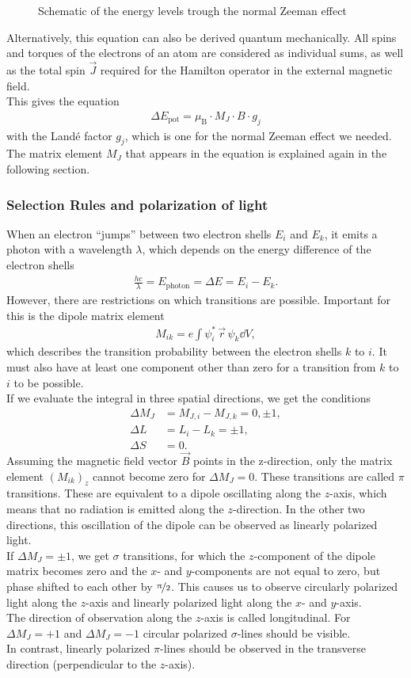\begin{figure}[ht]
\centering

\caption{Schematic of the energy levels trough the normal Zeeman effect}
\label{fig:splitting}
\end{figure}

Alternatively, this equation can also be derived quantum mechanically.
All spins and torques of the electrons of an atom are considered as individual sums, as well as the total spin $\vec{J}$ required for the Hamilton operator in the external magnetic field.\\
This gives the equation
\begin{align}
\Delta E_\text{pot} = \mu_\text{B} \cdot M_J \cdot B \cdot g_j
\end{align}
with the Landé factor $g_j$, which is one for the normal Zeeman effect we needed.
The matrix element $M_J$ that appears in the equation is explained again in the following section.

\subsubsection{Selection Rules and polarization of light}
When an electron \enquote{jumps} between two electron shells $E_i$ and $E_k$, it emits a photon with a wavelength $\lambda$, which depends on the energy difference of the electron shells
\begin{align}
\frac{hc}{\lambda} = E_\text{photon} = \Delta E = E_i - E_k.
\end{align}
However, there are restrictions on which transitions are possible.
Important for this is the dipole matrix element
\begin{align}
M_{ik} = e \int \psi_i^* \, \vec{r} \, \psi_k \dd{V},
\end{align}
which describes the transition probability between the electron shells $k$ to $i$.
It must also have at least one component other than zero for a transition from $k$ to $i$ to be possible.\\
If we evaluate the integral in three spatial directions, we get the conditions
\begin{align}
\Delta M_J &= M_{J,i} - M_{J,k} = 0, \pm 1,\\
\Delta L &= L_i - L_k = \pm 1,\\
\Delta S &= 0.
\end{align}
Assuming the magnetic field vector $\vec{B}$ points in the z-direction, only the matrix element $(M_{ik})_z$ cannot become zero for $\Delta M_J = 0$.
These transitions are called $\pi$ transitions.
These are equivalent to a dipole oscillating along the $z$-axis, which means that no radiation is emitted along the $z$-direction. In the other two directions, this oscillation of the dipole can be observed as linearly polarized light.\\
If $\Delta M_J = \pm 1$, we get $\sigma$ transitions, for which the $z$-component of the dipole matrix becomes zero and the $x$- and $y$-components are not equal to zero, but phase shifted to each other by $\nicefrac{\pi}{2}$.
This causes us to observe circularly polarized light along the $z$-axis and linearly polarized light along the $x$- and $y$-axis.\\

The direction of observation along the $z$-axis is called longitudinal. For $\Delta M_J = + 1$ and $\Delta M_J = - 1$ circular polarized $\sigma$-lines should be visible.\\
In contrast, linearly polarized $\pi$-lines should be observed in the transverse direction (perpendicular to the $z$-axis).